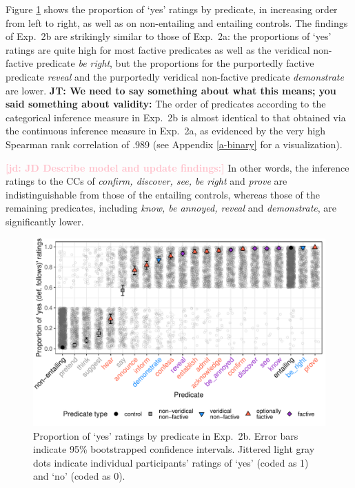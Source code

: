 \documentclass[11pt,fleqn]{article}
\newcommand{\jd}[1]{\textbf{\textcolor{Pink}{[jd: #1]}}}
\newcommand{\6}{\mbox{$[\hspace*{-.6mm}[$}}
\newcommand{\9}{\mbox{$]\hspace*{-.6mm}]$}}
\newcommand{\jt}[1]{\textbf{\color{blue}JT: #1}}
\begin{document}
Figure \ref{fig:2bresults} shows the proportion of `yes' ratings by predicate, in increasing order from left to right, as well as on non-entailing and entailing controls. The findings of Exp.~2b are strikingly similar to those of Exp.~2a: the proportions of `yes' ratings are quite high for most factive predicates as well as the veridical non-factive predicate {\em be right}, but the proportions for the purportedly factive predicate {\em reveal} and the purportedly veridical non-factive predicate {\em demonstrate} are lower. \jt{We need to say something about what this means; you said something about validity:} The order of predicates according to the categorical inference measure in  Exp.~2b is almost identical to that obtained via the continuous inference measure in Exp.~2a, as evidenced by the very high Spearman rank correlation of .989 (see Appendix \ref{a-binary} for a visualization). 

\jd{JD Describe model and update findings:} In other words, the inference ratings to the CCs of {\em confirm, discover, see, be right} and {\em prove} are indistinguishable from those of the entailing controls, whereas those of the remaining predicates, including {\em know, be annoyed, reveal} and {\em demonstrate}, are significantly lower. 
 
\begin{figure}[H]
\centering
\includegraphics[width=.7\paperwidth]{../../results/7-veridicality3-binary/graphs/proportion-by-predicate-variability-individual}

\caption{Proportion of `yes' ratings by predicate in Exp.~2b. Error bars indicate 95\% bootstrapped confidence intervals. Jittered light gray dots indicate individual participants' ratings of `yes' (coded as 1) and `no' (coded as 0).}
\label{fig:2bresults}
\end{figure}
\end{document}
